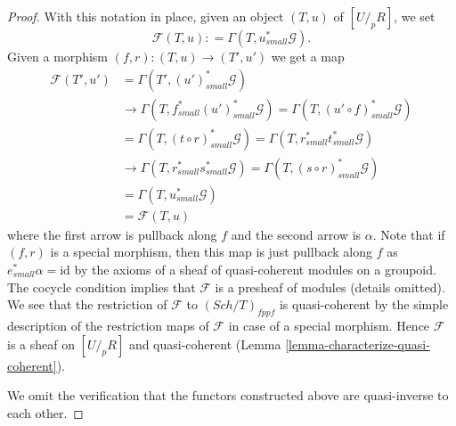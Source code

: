 \documentclass[10pt,a4paper]{amsart}
\theoremstyle{plain}
\theoremstyle{definition}
\theoremstyle{remark}
\numberwithin{equation}{subsection}
\def\Sch{\mathit{Sch}}
\begin{document}
\begin{proof}
\medskip\noindent
With this notation in place, given an object $(T, u)$ of $[U/_{\!p}R]$, we set
$$
\mathcal{F}(T, u) : = \Gamma(T, u_{small}^*\mathcal{G}).
$$
Given a morphism $(f, r) : (T, u) \to (T', u')$ we get a map
\begin{align*}
\mathcal{F}(T', u') & = \Gamma(T', (u')_{small}^*\mathcal{G}) \\
& \to \Gamma(T, f_{small}^*(u')_{small}^*\mathcal{G}) =
\Gamma(T, (u' \circ f)_{small}^*\mathcal{G}) \\
& = \Gamma(T, (t \circ r)_{small}^*\mathcal{G}) =
\Gamma(T, r_{small}^*t_{small}^*\mathcal{G}) \\
& \to \Gamma(T, r_{small}^*s_{small}^*\mathcal{G}) =
\Gamma(T, (s \circ r)_{small}^*\mathcal{G}) \\
& = \Gamma(T, u_{small}^*\mathcal{G}) \\
& = \mathcal{F}(T, u)
\end{align*}
where the first arrow is pullback along $f$ and the second arrow is
$\alpha$. Note that if $(f, r)$ is a special morphism, then this
map is just pullback along $f$ as $e_{small}^*\alpha = \text{id}$ by
the axioms of a sheaf of quasi-coherent modules on a groupoid.
The cocycle condition implies that $\mathcal{F}$ is a presheaf
of modules (details omitted). We see that the restriction of $\mathcal{F}$
to $(\Sch/T)_{fppf}$ is quasi-coherent by the simple description of the
restriction maps of $\mathcal{F}$ in case of a special morphism.
Hence $\mathcal{F}$ is a sheaf on $[U/_{\!p}R]$ and quasi-coherent
(Lemma \ref{lemma-characterize-quasi-coherent}).

\medskip\noindent
We omit the verification that the functors constructed above are
quasi-inverse to each other.
\end{proof}
\end{document}
